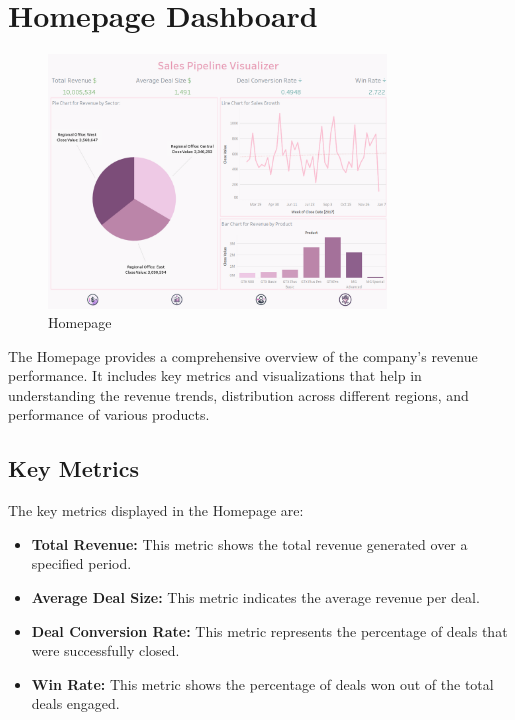 \documentclass{article}
\begin{document}
\section{Homepage Dashboard}
\begin{figure}[h!]
    \centering
    \includegraphics[width=0.8\textwidth]{resources/swappy-20240527_141415.png}
    \caption{Homepage}
\end{figure}

The Homepage provides a comprehensive overview of the company's revenue performance. It includes key metrics and visualizations that help in understanding the revenue trends, distribution across different regions, and performance of various products.

\subsection{Key Metrics}
The key metrics displayed in the Homepage are:
\begin{itemize}
    \item \textbf{Total Revenue:} This metric shows the total revenue generated over a specified period.
    \item \textbf{Average Deal Size:} This metric indicates the average revenue per deal.
    \item \textbf{Deal Conversion Rate:} This metric represents the percentage of deals that were successfully closed.
    \item \textbf{Win Rate:} This metric shows the percentage of deals won out of the total deals engaged.
\end{itemize}
\end{document}
